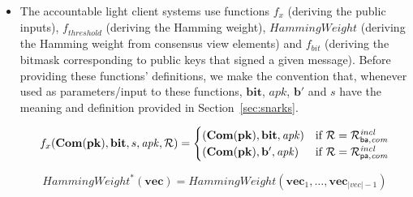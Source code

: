 \begin{itemize}
\item The accountable light client systems use functions $f_x$ (deriving the public inputs), 
$\mathit{f_{\mathit{threshold}}}$ (deriving the Hamming weight), $\mathit{HammingWeight}$ (deriving the Hamming 
weight from consensus view elements) and $f_{\mathit{bit}}$ (deriving the bitmask corresponding to public keys that 
signed a given message). Before providing these functions' definitions, we make the convention that, 
whenever used as parameters/input to these functions, $\mathbf{bit}$, $\mathit{apk}$, $\mathbf{b'}$ and $s$ have 
the meaning and definition provided in Section~\ref{sec:snarks}. 

\begin{equation*}
 f_x (\mathbf{Com}(\mathbf{pk}), \mathbf{bit}, s,\mathit{apk}, \mathcal{R}) =
   \begin{cases}
    (\mathbf{Com}(\mathbf{pk}), \mathbf{bit}, \mathit{apk}) & \text{if } \mathcal{R} = \mathcal{R}^{\mathit{incl}}_{\mathsf{ba},\mathit{com}} \\
     (\mathbf{Com}(\mathbf{pk}), \mathbf{b'}, \mathit{apk}) & \text{if } \mathcal{R} = \mathcal{R}^{\mathit{incl}}_{\mathsf{pa},\mathit{com}} \\
  \end{cases}       
\end{equation*}


\begin{equation*}
\mathit{HammingWeight^*}(\mathbf{vec}) = \mathit{HammingWeight}(\mathbf{vec}_{1}, \ldots, \mathbf{vec}_{|\mathit{vec}| - 1})
\end{equation*}



\end{itemize}
